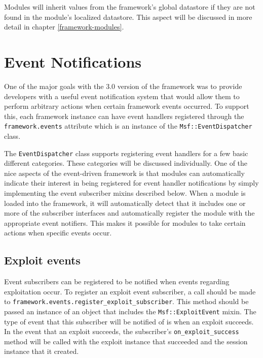 \documentclass{report}
\begin{document}
\par
Modules will inherit values from the framework's global datastore if
they are not found in the module's localized datastore.  This aspect
will be discussed in more detail in chapter \ref{framework-modules}.

    \section{Event Notifications}

\par
One of the major goals with the 3.0 version of the framework was to
provide developers with a useful event notification system that
would allow them to perform arbitrary actions when certain framework
events occurred.  To support this, each framework instance can have
event handlers registered through the \texttt{framework.events}
attribute which is an instance of the \texttt{Msf::EventDispatcher}
class.

\par
The \texttt{EventDispatcher} class supports registering event
handlers for a few basic different categories.  These categories
will be discussed individually.  One of the nice aspects of the
event-driven framework is that modules can automatically indicate
their interest in being registered for event handler notifications
by simply implementing the event subscriber mixins described below.
When a module is loaded into the framework, it will automatically
detect that it includes one or more of the subscriber interfaces and
automatically register the module with the appropriate event
notifiers.  This makes it possible for modules to take certain
actions when specific events occur.

        \subsection{Exploit events}

\par
Event subscribers can be registered to be notified when events
regarding exploitation occur.  To register an exploit event
subscriber, a call should be made to
\texttt{framework.events.register\_exploit\_subscriber}.  This
method should be passed an instance of an object that includes the
\texttt{Msf::ExploitEvent} mixin.  The type of event that this
subscriber will be notified of is when an exploit succeeds.  In the
event that an exploit succeeds, the subscriber's
\texttt{on\_exploit\_success} method will be called with the exploit
instance that succeeded and the session instance that it created.
\end{document}

